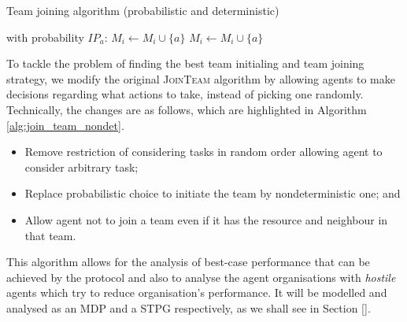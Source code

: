 \documentclass{llncs}
\newcommand{\comment}[1]{\marginpar{\footnotesize \color{red} \textsf{#1}}}
\begin{document}
\begin{algorithm}[H]
\caption{Team joining algorithm \cite{gaston2005agent} (probabilistic and deterministic)}
\label{alg:join_team_org}
\begin{scriptsize}
\begin{algorithmic}
     
       
	 
	  \State with probability $IP_a$: $M_i \leftarrow M_i \cup \{a\}$ 
	\EndIf
       
	 
	  \State $M_i \leftarrow M_i \cup \{a\}$ 
	\EndIf
      \EndIf
    \EndIf
  \EndFor
\EndProcedure
\end{algorithmic}
\end{scriptsize}
\end{algorithm}
%

To tackle the problem of finding the best team initialing and team joining strategy, we modify the original \textsc{JoinTeam} algorithm by
allowing agents to make decisions regarding what actions to take, instead of picking one randomly. Technically, the changes are as follows, which
are highlighted in Algorithm \ref{alg:join_team_nondet}.
\begin{itemize}
 \item Remove restriction of considering tasks in random order allowing agent to consider arbitrary task;
 \item Replace probabilistic choice to initiate the team by nondeterministic one; and
 \item Allow agent not to join a team even if it has the resource and neighbour in that team.
\end{itemize}

This algorithm allows for the analysis of best-case performance that can be achieved by the protocol and also to analyse the agent organisations with \emph{hostile} agents which try to reduce organisation's performance. It will be modelled and analysed as an MDP and a STPG respectively, as we shall see in Section \ref{}.
\end{document}
